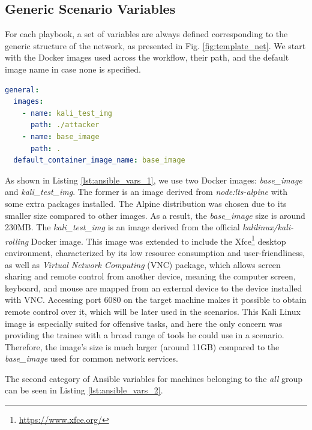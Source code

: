 \subsection{Generic Scenario Variables} \label{sec:generic_scenario_variables}

For each playbook, a set of variables are always defined corresponding to the generic structure of the network, as presented in Fig. \ref{fig:template_net}. We start with the Docker images used across the workflow, their path, and the default image name in case none is specified.

\begin{lstlisting}[language=yaml,caption=Ansible Variables - Docker Images.,numbers=none,label={lst:ansible_vars_1}]
general:
  images:
    - name: kali_test_img
      path: ./attacker
    - name: base_image
      path: .
  default_container_image_name: base_image
\end{lstlisting}

As shown in Listing \ref{lst:ansible_vars_1}, we use two Docker images: \textit{base\_image} and \textit{kali\_test\_img}. The former is an image derived from \textit{node:lts-alpine} with some extra packages installed. The Alpine distribution was chosen due to its smaller size compared to other images. As a result, the \textit{base\_image} size is around 230MB. The \textit{kali\_test\_img} is an image derived from the official \textit{kalilinux/kali-rolling} Docker image. This image was extended to include the Xfce\footnote{\url{https://www.xfce.org/}} desktop environment, characterized by its low resource consumption and user-friendliness, as well as \textit{Virtual Network Computing} (VNC) package, which allows screen sharing and remote control from another device, meaning the computer screen, keyboard, and mouse are mapped from an external device to the device installed with VNC. Accessing port 6080 on the target machine makes it possible to obtain remote control over it, which will be later used in the scenarios. This Kali Linux image is especially suited for offensive tasks, and here the only concern was providing the trainee with a broad range of tools he could use in a scenario. Therefore, the image's size is much larger (around 11GB) compared to the \textit{base\_image} used for common network services.

The second category of Ansible variables for machines belonging to the \textit{all} group can be seen in Listing \ref{lst:ansible_vars_2}.

